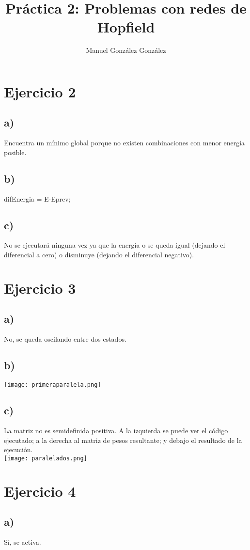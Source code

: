 \documentclass[12pt]{article}
\title{Práctica 2: Problemas con redes de Hopfield}
\author{Manuel González González}
\begin{document}
\maketitle
\section*{Ejercicio 2}
\subsection*{a)}
Encuentra un mínimo global porque no existen combinaciones con menor energía posible.
\subsection*{b)}
difEnergia = E-Eprev;
\subsection*{c)}
No se ejecutará ninguna vez ya que la energía o se queda igual (dejando el diferencial a cero) o disminuye (dejando el diferencial negativo).

\section*{Ejercicio 3}
\subsection*{a)}
No, se queda oscilando entre dos estados.
\subsection*{b)}
\texttt{[image: primeraparalela.png]}
\subsection*{c)}
La matriz no es semidefinida positiva. A la izquierda se puede ver el código ejecutado; a la derecha al matriz de pesos resultante; y debajo el resultado de la ejecución.\\
\texttt{[image: paralelados.png]}

\section*{Ejercicio 4}
\subsection*{a)}
Sí, se activa.
\end{document}
